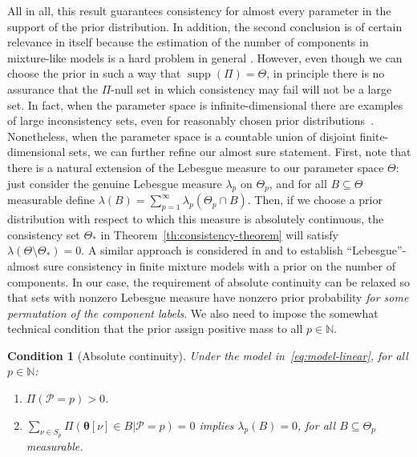 \documentclass{article}
\numberwithin{equation}{section}
\theoremstyle{plain}
\newtheorem{condition}{Condition}[section]
\newcommand{\N}{\mathbb{N}}
\DeclareMathOperator{\supp} {supp}
\begin{document}
All in all, this result guarantees consistency for almost every parameter in the support of the prior distribution. In addition, the second conclusion is of certain relevance in itself because the estimation of the number of components in mixture-like models is a hard problem in general \citep[see][and references therein]{miller2018mixture}. However, even though we can choose the prior in such a way that \(\supp( \Pi) = \Theta\), in principle there is no assurance that the \(\Pi\)-null set in which consistency may fail will not be a large set. In fact, when the parameter space is infinite-dimensional there are examples of large inconsistency sets, even for reasonably chosen prior distributions~\citep[e.g.][]{diaconis1986consistency}. Nonetheless, when the parameter space is a countable union of disjoint finite-dimensional sets, we can further refine our almost sure statement. First, note that there is a natural extension of the Lebesgue measure to our parameter space \(\Theta\): just consider the genuine Lebesgue measure \(\lambda_p\) on \(\Theta_p\), and for all \(B\subseteq \Theta\) measurable define \(\lambda(B) = \sum_{p=1}^\infty \lambda_p(\Theta_p \cap B)\). Then, if we choose a prior distribution with respect to which this measure is absolutely continuous, the consistency set \(\Theta_*\) in Theorem~\ref{th:consistency-theorem} will satisfy \(\lambda(\Theta \setminus \Theta_*)=0\). A
similar approach is considered in \citet{nobile1994bayesian} and \citet{miller2023consistency} to establish ``Lebesgue''-almost sure consistency in finite mixture models with a prior on the number of components. In our case, the requirement of absolute continuity can be relaxed so that sets with nonzero Lebesgue measure have nonzero prior probability \textit{for some permutation of the component labels}. We also need to impose the somewhat technical condition that the prior assign positive mass to all \(p\in\N\).

\begin{condition}[Absolute continuity] Under the model in~\eqref{eq:model-linear}, for all \(p\in\N\):\label{cond:condition-lebesgue}
  \begin{enumerate}
    \item \(\Pi(\mathcal P = p) > 0\).\label{cond:condition-lebesgue-1}
    \item \(\sum_{\nu\in S_p} \Pi(\bm \theta[\nu] \in B|\mathcal P = p) = 0\) implies \(\lambda_p(B)=0\), for all \(B\subseteq \Theta_p\) measurable.\label{cond:condition-lebesgue-2}
  \end{enumerate}
\end{condition}
\end{document}
